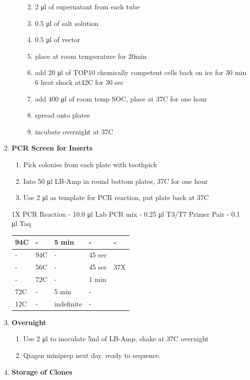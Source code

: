 \documentclass[
  letterpaper,
  DIV=11,
  numbers=noendperiod]{scrreprt}
\providecommand{\tightlist}{%
  \setlength{\itemsep}{0pt}\setlength{\parskip}{0pt}}\usepackage{longtable,booktabs,array}
\begin{document}
\begin{enumerate}
\begin{enumerate}
    \begin{enumerate}
    \def\labelenumiii{\arabic{enumiii}.}
    \tightlist
    \item
      2 μl of supernatant from each tube
    \item
      0.5 μl of salt solution
    \item
      0.5 μl of vector
    \item
      place at room temperature for 20min
    \item
      add 20 μl of TOP10 chemically competent cells back on ice for 30
      min 6 heat shock at42C for 30 sec
    \item
      add 400 μl of room temp SOC, place at 37C for one hour
    \item
      spread onto plates
    \item
      incubate overnight at 37C
    \end{enumerate}
  \end{enumerate}
\item
  \textbf{PCR Screen for Inserts}

  \begin{enumerate}
  \def\labelenumii{\arabic{enumii}.}
  \tightlist
  \item
    Pick colonies from each plate with toothpick
  \item
    Into 50 μl LB-Amp in round bottom plates, 37C for one hour
  \item
    Use 2 μl as template for PCR reaction, put plate back at 37C
  \end{enumerate}

  1X PCR Reaction - 10.0 μl Lab PCR mix - 0.25 μl T3/T7 Primer Pair -
  0.1 μl Taq

  \begin{longtable}[]{@{}lllll@{}}
  \toprule\noalign{}
  94C & - & 5 min & - & - \\
  \midrule\noalign{}
  \endhead
  \bottomrule\noalign{}
  \endlastfoot
  - & 94C & - & 45 sec & \\
  - & 56C & - & 45 sec & 37X \\
  - & 72C & - & 1 min & \\
  72C & - & 5 min & - & \\
  12C & - & indefinite & - & \\
  \end{longtable}
\item
  \textbf{Overnight}

  \begin{enumerate}
  \def\labelenumii{\arabic{enumii}.}
  \tightlist
  \item
    Use 2 μl to inoculate 5ml of LB-Amp, shake at 37C overnight
  \item
    Qiagen miniprep next day, ready to sequence.
  \end{enumerate}
\item
  \textbf{Storage of Clones}


\end{enumerate}
\end{document}
